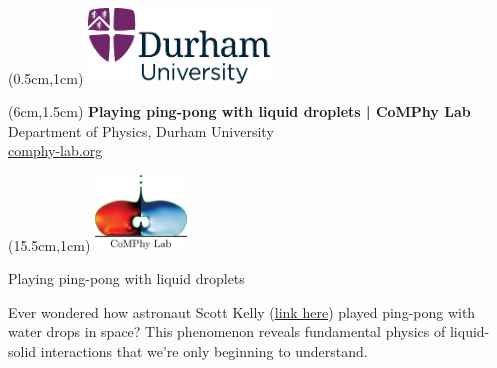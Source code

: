 \documentclass[11pt]{article}
\newlength{\headertobodysep}
\begin{document}
\thispagestyle{empty}

\textblockorigin{0pt}{0pt}

\begin{textblock*}{5cm}(0.5cm,1cm)
    \includegraphics[height=2cm]{../_logosAndRef/Durham-University.pdf}
\end{textblock*}

\begin{textblock*}{9cm}(6cm,1.5cm)
    \centering
    {\large \textbf{Playing ping-pong with liquid droplets | CoMPhy Lab}}\\[0.2em]
    Department of Physics, Durham University\\[0.3em]
    \href{https://comphy-lab.org}{comphy-lab.org}
\end{textblock*}

\begin{textblock*}{5cm}(15.5cm,1cm) %
    \includegraphics[height=2cm]{../_logosAndRef/CoMPhy-Lab.png}
\end{textblock*}

\vspace*{\headertobodysep}

\begin{center}
    \begin{LARGE}
     Playing ping-pong with liquid droplets
    \end{LARGE}
\end{center}

\noindent Ever wondered how astronaut Scott Kelly (\href{https://www.youtube.com/watch?v=TLbhrMCM4_0}{link here}) played ping-pong with water drops in space? This phenomenon reveals fundamental physics of liquid-solid interactions that we're only beginning to understand.
\end{document}
